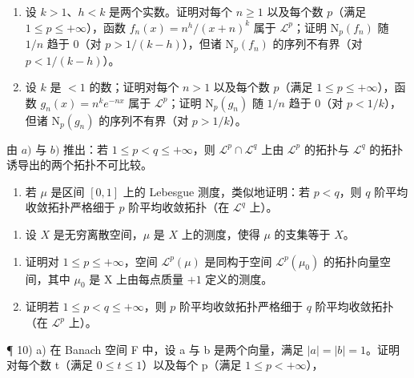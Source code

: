 \begin{enumerate}
\def\labelenumi{\alph{enumi})}
\item
  设 \(k > 1\)、\(h < k\) 是两个实数。证明对每个 \(n \geqslant 1\) 以及每个数 \(p\)（满足 \(1 \leqslant p \leqslant +\infty\)），函数 \(f_n(x) = n^h / (x + n)^k\) 属于 \(\mathcal{L}^p\)；证明 \(\mathrm{N}_p(f_n)\) 随 \(1/n\) 趋于 0（对 \(p > 1 / (k - h)\)），但诸 \(\mathrm{N}_p(f_n)\) 的序列不有界（对 \(p < 1 / (k - h)\)）。
\item
  设 \(k\) 是 \(< 1\) 的数；证明对每个 \(n > 1\) 以及每个数 \(p\)（满足 \(1 \leqslant p \leqslant +\infty\)），函数 \(g_n(x) = n^k e^{-nx}\) 属于 \(\mathcal{L}^p\)；证明 \(\mathrm{N}_p(g_n)\) 随 \(1/n\) 趋于 0（对 \(p < 1/k\)），但诸 \(\mathrm{N}_p(g_n)\) 的序列不有界（对 \(p > 1/k\)）。
\end{enumerate}

由 \(a)\) 与 \(b)\) 推出：若 \(1 \leqslant p < q \leqslant +\infty\)，则 \(\mathcal{L}^p \cap \mathcal{L}^q\) 上由 \(\mathcal{L}^p\) 的拓扑与 \(\mathcal{L}^q\) 的拓扑诱导出的两个拓扑不可比较。

\begin{enumerate}
\def\labelenumi{\alph{enumi})}
\setcounter{enumi}{2}
\tightlist
\item
  若 \(\mu\) 是区间 \([0,1]\) 上的 Lebesgue 测度，类似地证明：若 \(p < q\)，则 \(q\) 阶平均收敛拓扑严格细于 \(p\) 阶平均收敛拓扑（在 \(\mathcal{L}^q\) 上）。
\end{enumerate}

\begin{enumerate}
\def\labelenumi{\arabic{enumi})}
\setcounter{enumi}{8}
\tightlist
\item
  设 \(X\) 是无穷离散空间，\(\mu\) 是 \(X\) 上的测度，使得 \(\mu\) 的支集等于 \(X\)。
\end{enumerate}

\begin{enumerate}
\def\labelenumi{\alph{enumi})}
\item
  证明对 \(1 \leqslant p \leqslant +\infty\)，空间 \(\mathcal{L}^p(\mu)\) 是同构于空间 \(\mathcal{L}^p(\mu_0)\) 的拓扑向量空间，其中 \(\mu_0\) 是 X 上由每点质量 \(+1\) 定义的测度。
\item
  证明若 \(1 \leqslant p < q \leqslant +\infty\)，则 \(p\) 阶平均收敛拓扑严格细于 \(q\) 阶平均收敛拓扑（在 \(\mathcal{L}^p\) 上）。
\end{enumerate}

¶ 10) a) 在 Banach 空间 F 中，设 a 与 b 是两个向量，满足 \(|a| = |b| = 1\)。证明对每个数 t（满足 \(0 \leqslant t \leqslant 1\)）以及每个 p（满足 \(1 \leqslant p < +\infty\)），

